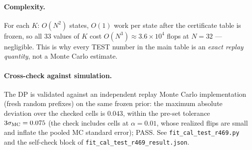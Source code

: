 \paragraph{Complexity.}
For each $K$: $O(N^2)$ states, $O(1)$ work per state after the
certificate table is frozen, so all 33 values of $K$ cost
$O(N^3)\approx 3.6\times 10^4$ flops at $N=32$ --- negligible. This is
why every TEST number in the main table is an \emph{exact replay
quantity}, not a Monte Carlo estimate.

\paragraph{Cross-check against simulation.}
The DP is validated against an independent replay Monte Carlo
implementation (fresh random prefixes) on the same frozen prior: the
maximum absolute deviation over the checked cells is $0.043$, within the
pre-set tolerance $3\sigma_{\rm MC}=0.075$ (the check includes cells at
$\alpha=0.01$, whose realized flips are small and inflate the pooled MC
standard error); PASS. See \texttt{fit\_cal\_test\_r469.py} and the
self-check block of \texttt{fit\_cal\_test\_r469\_result.json}.
